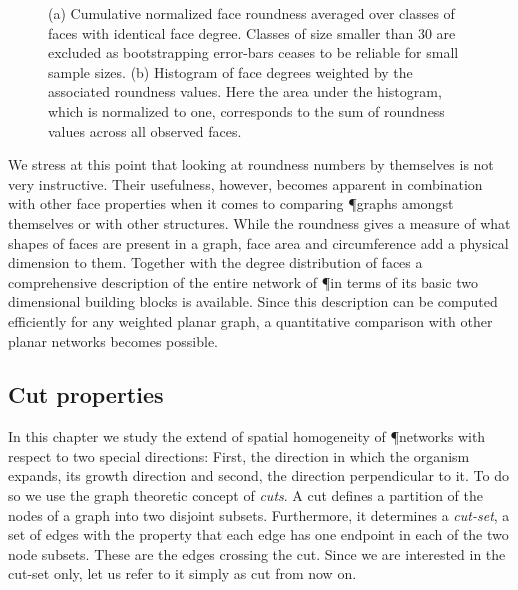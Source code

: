 		\begin{figure}
			\centering
			\qquad

			\caption[Average face roundness per face type]{(a) Cumulative normalized face roundness averaged over classes of faces with identical face degree. Classes of size smaller than $30$ are excluded as bootstrapping error-bars ceases to be reliable for small sample sizes. (b) Histogram of face degrees weighted by the associated roundness values. Here the area under the histogram, which is normalized to one, corresponds to the sum of roundness values across all observed faces.}
		\end{figure}

		We stress at this point that looking at roundness numbers by themselves is not very instructive. Their usefulness, however, becomes apparent in combination with other face properties when it comes to comparing \P graphs amongst themselves or with other structures. While the roundness gives a measure of what shapes of faces are present in a graph, face area and circumference add a physical dimension to them. Together with the degree distribution of faces a comprehensive description of the entire network of \P in terms of its basic two dimensional building blocks is available. Since this description can be computed efficiently for any weighted planar graph, a quantitative comparison with other planar networks becomes possible.

	\subsection{Cut properties}\label{sec:cut_properties}

		In this chapter we study the extend of spatial homogeneity of \P networks with respect to two special directions: First, the direction in which the organism expands, \ie its growth direction and second, the direction perpendicular to it. To do so we use the graph theoretic concept of \emph{cuts}. A cut defines a partition of the nodes of a graph into two disjoint subsets. Furthermore, it determines a \emph{cut-set}, a set of edges with the property that each edge has one endpoint in each of the two node subsets. These are the edges crossing the cut. Since we are interested in the cut-set only, let us refer to it simply as cut from now on. 

